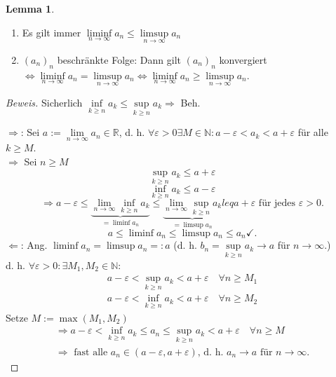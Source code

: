 \documentclass[12pt,a4paper,titlepage]{article} %
\theoremstyle{definition}
\newtheorem{lem}[satz]{Lemma}
\theoremstyle{remark}
\newenvironment{bew}{\begin{proof}[Beweis]}{\end{proof}}
\newcommand{\N}{\mathbb{N}}
\newcommand{\R}{\mathbb{R}}
\newcommand{\limes}[1]{\lim\limits_{#1\rightarrow\infty}}
\begin{document}
\begin{lem}
	\begin{enumerate}
		\item Es gilt immer \( \liminf\limits_{n\rightarrow\infty}a_n \leq \limsup\limits_{n\rightarrow\infty}a_n \)
		\item \((a_n)_n\) beschränkte Folge: Dann gilt \((a_n)_n\) konvergiert \( \Leftrightarrow \liminf\limits_{n\rightarrow\infty}a_n = \limsup\limits_{n\rightarrow\infty}a_n \Leftrightarrow \liminf\limits_{n\rightarrow\infty}a_n \geq \limsup\limits_{n\rightarrow\infty}a_n \).
	\end{enumerate}
\end{lem}
\begin{bew}
	\item Sicherlich \( \underset{k\geq n}{\inf}a_k \leq \underset{k\geq n}{\sup} a_k \Rightarrow \) Beh. \checkmark
	\item \glqq\(\Rightarrow \)\grqq: Sei \(a:= \limes{n}a_n\in\R\), d. h. \( \forall \varepsilon > 0 \exists M\in\N: a-\varepsilon < a_k < a+ \varepsilon \) für alle \(k \geq M \).\\
	\( \Rightarrow \) Sei \(n\geq M\) 
	\[ \underset{k\geq n}{\sup} a_k \leq a+\varepsilon \]
	\[ \underset{k\geq n}{\inf} a_k \leq a-\varepsilon \]
	\[ \Rightarrow a-\varepsilon \leq \underbrace{\limes{n}\underset{k\geq n}{\inf}a_k}_{=\liminf a_n} \leq \underbrace{\limes{n}\underset{k\geq n}{\sup}a_k}_{=\limsup a_n}leq a+\varepsilon \text{ für jedes } \varepsilon>0. \]
	\[ a\leq \liminf a_n \leq \limsup a_n \leq a_n \checkmark. \]
	\glqq\(\Leftarrow\)\grqq: Ang. \( \liminf a_n = \limsup a_n =: a \) (d. h. \(b_n =  \underset{k\geq n}{\sup} a_k \rightarrow a \) für \( n\rightarrow\infty \).)\\
	d. h. \( \forall \varepsilon>0: \exists M_1,M_2 \in\N: \)
	\begin{align*}
		a-\varepsilon < \underset{k\geq n}{\sup} a_k < a + \varepsilon \quad \forall n\geq M_1\\
		a-\varepsilon < \underset{k\geq n}{\inf} a_k < a + \varepsilon \quad \forall n\geq M_2
	\end{align*}
	Setze \(M := \max(M_1, M_2) \)\\
	\begin{align*}
		\Rightarrow a-\varepsilon < \underset{k\geq n}{\inf} a_k \leq a_n \leq \underset{k\geq n}{\sup} a_k < a + \varepsilon \quad \forall n\geq M\\
		\Rightarrow \text{ fast alle } a_n\in(a-\varepsilon,a+\varepsilon)\text{, d. h. }a_n\rightarrow a \text{ für } n\rightarrow \infty.
	\end{align*}
\end{bew}
\end{document}
